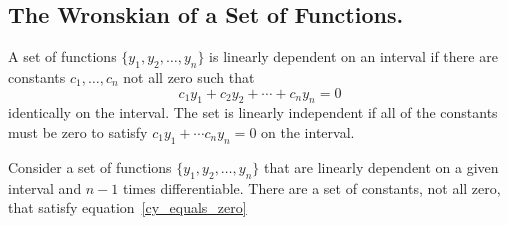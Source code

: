 \subsection{The Wronskian of a Set of Functions.}
A set of functions $\{y_1, y_2, \ldots, y_n\}$ is linearly dependent
on an interval if  there are constants $c_1, \ldots, c_n$ not all zero
such that
\begin{equation}  \label{cy_equals_zero}
  c_1 y_1 + c_2 y_2 + \cdots + c_n y_n = 0
\end{equation}
identically on the interval.  The set is linearly independent if all of the 
constants must be zero to satisfy $c_1 y_1 + \cdots c_n y_n = 0$ on the 
interval.

Consider a set of functions $\{y_1, y_2, \ldots, y_n\}$ that are linearly
dependent on a given interval and $n-1$ times differentiable.  
There are a set of constants, not all zero, that satisfy 
equation~\ref{cy_equals_zero}

